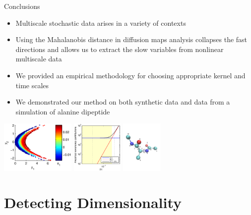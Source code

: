 \documentclass[12pt]{beamer}
\begin{document}
\begin{frame}{Conclusions}

\begin{itemize}
\item Multiscale stochastic data arises in a variety of contexts
\item Using the Mahalanobis distance in diffusion maps analysis collapses the fast directions and allows us to extract the slow variables from nonlinear multiscale data
\item We provided an empirical methodology for choosing appropriate kernel and time scales 
\item We demonstrated our method on both synthetic data and data from a simulation of alanine dipeptide
\end{itemize}

\vfill

\includegraphics[height=1in]{data_nonlinear_NIV_dt1_kernel1}
\hfill
\includegraphics[height=1in]{C_dt_analytical_nonlinear2}
\hfill
\includegraphics[height=1in]{molecule2}

\end{frame}

\section{Detecting Dimensionality}
\end{document}
